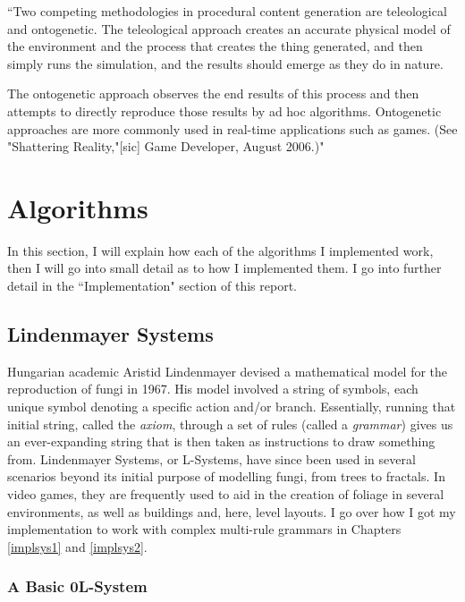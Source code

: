 ``Two competing methodologies in procedural content generation are teleological and ontogenetic. The teleological approach creates an accurate physical model of the environment and the process that creates the thing generated, and then simply runs the simulation, and the results should emerge as they do in nature.

The ontogenetic approach observes the end results of this process and then attempts to directly reproduce those results by ad hoc algorithms. Ontogenetic approaches are more commonly used in real-time applications such as games. (See "Shattering Reality,"[sic] Game Developer, August 2006.)"\cite{teleonto}\cite{shatteringreality}\cite{randomscattering}

\section{Algorithms}

In this section, I will explain how each of the algorithms I implemented work, then I will go into small detail as to how I implemented them. I go into further detail in the ``Implementation" section of this report.

\subsection{Lindenmayer Systems} \label{alglsys}

Hungarian academic Aristid Lindenmayer devised a mathematical model for the reproduction of fungi in 1967.\cite{LINDENMAYER1968300} His model involved a string of symbols, each unique symbol denoting a specific action and/or branch. Essentially, running that initial string, called the \emph{axiom}, through a set of rules (called a \emph{grammar}) gives us an ever-expanding string that is then taken as instructions to draw something from. Lindenmayer Systems, or L-Systems, have since been used in several scenarios beyond its initial purpose of modelling fungi, from trees to fractals. In video games, they are frequently used to aid in the creation of foliage in several environments, as well as buildings and, here, level layouts. I go over how I got my implementation to work with complex multi-rule grammars in Chapters \ref{implsys1} and \ref{implsys2}.

\subsubsection{A Basic 0L-System} \label{lbasic}

